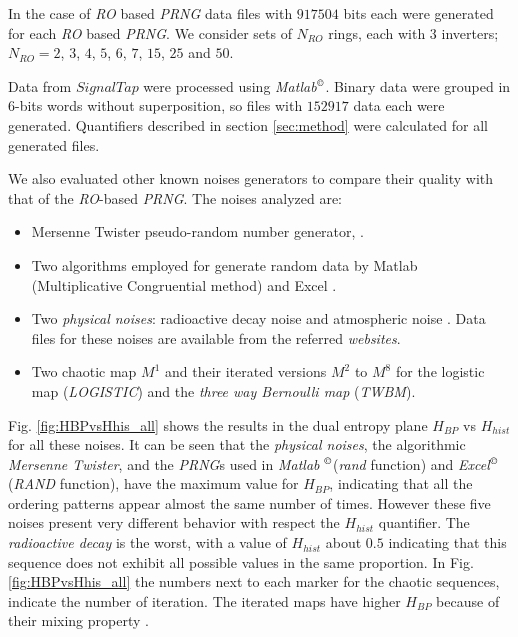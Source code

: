 In the case of \emph{RO} based \emph{PRNG}
data files with $917504$ bits each were generated for each \emph{RO} based \emph{PRNG}.
We consider sets of $N_{RO}$ rings, each with $3$ inverters; $N_{RO}=2$, $3$, $4$, $5$, $6$, $7$, $15$, $25$ and $50$.

Data from $SignalTap$ were  processed using \emph{Matlab}$^\copyright$. Binary data were grouped in $6$-bits words without
superposition, so files with $152917$ data each were generated. Quantifiers described in section \ref{sec:method} were calculated
for all generated files.

We also evaluated other known noises generators to compare their quality with that of  the \emph{RO}-based \emph{PRNG}.
The noises analyzed are:

\begin{itemize}
  \item Mersenne Twister pseudo-random number generator, \cite{Matsumoto1998}.
  \item Two algorithms employed for generate random data by Matlab (Multiplicative Congruential method) \cite{Matlab} and Excel \cite{McLeod1985}.
  \item Two \emph{physical noises}: radioactive decay noise \cite{Walker2001} and atmospheric noise \cite{Haahr}.
  Data files for these noises are available from the referred \emph{websites}.
  \item Two chaotic map $M^1$ and their iterated versions $M^2$ to $M^8$ \cite{DeMicco2008} for the logistic map (\emph{LOGISTIC}) and the \emph{three way Bernoulli map} (\emph{TWBM}).
\end{itemize}

Fig. \ref{fig:HBPvsHhis_all} shows the results in the dual entropy plane $H_{BP}$ vs $H_{hist}$ for all these noises.
It can be seen that the \emph{physical noises}, the algorithmic \emph{Mersenne Twister}, and the \emph{PRNG}s used in \emph{Matlab} $^\copyright$(\emph{rand} function) and \emph{Excel}$^\copyright$ (\emph{RAND} function), have the  maximum value for $H_{BP}$, indicating that all the ordering patterns appear almost the same number of times. However these five noises present very different behavior with respect the $H_{hist}$ quantifier. The \emph{radioactive decay} is the worst, with a value of $H_{hist}$ about $0.5$ indicating that this sequence does not exhibit all possible values in the same proportion. In Fig. \ref{fig:HBPvsHhis_all} the numbers next to each marker for the chaotic sequences, indicate the number of iteration. The iterated maps have higher $H_{BP}$ because of their mixing property \cite{DeMicco2008}.


